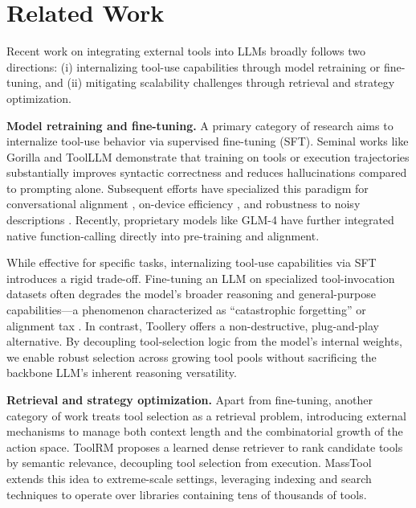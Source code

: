 \documentclass[11pt]{article}
\begin{document}
\section{Related Work}

Recent work on integrating external tools into LLMs broadly follows two directions: (i) internalizing tool-use capabilities through model retraining or fine-tuning, and (ii) mitigating scalability challenges through retrieval and strategy optimization.

\textbf{Model retraining and fine-tuning.}
A primary category of research aims to internalize tool-use behavior via supervised fine-tuning (SFT). Seminal works like Gorilla \cite{patil2024gorilla, touvron2023llama} and ToolLLM \cite{qin2023toolllm} demonstrate that training on tools or execution trajectories substantially improves syntactic correctness and reduces hallucinations compared to prompting alone. Subsequent efforts have specialized this paradigm for conversational alignment \cite{liu2024toolace, acikgoz2025can}, on-device efficiency \cite{erdogan2024tinyagent}, and robustness to noisy descriptions \cite{wang2025hammerbench}. Recently, proprietary models like GLM-4 \cite{zeng2025glm} have further integrated native function-calling directly into pre-training and alignment.

While effective for specific tasks, internalizing tool-use capabilities via SFT introduces a rigid trade-off. Fine-tuning an LLM on specialized tool-invocation datasets often degrades the model's broader reasoning and general-purpose capabilities---a phenomenon characterized as ``catastrophic forgetting'' or alignment tax \cite{kirkpatrick2017overcoming, luo2025empirical, fu-etal-2024-disperse}. In contrast, Toollery offers a non-destructive, plug-and-play alternative. By decoupling tool-selection logic from the model's internal weights, we enable robust selection across growing tool pools without sacrificing the backbone LLM's inherent reasoning versatility.


\textbf{Retrieval and strategy optimization.}
Apart from fine-tuning, another category of work treats tool selection as a retrieval problem, introducing external mechanisms to manage both context length and the combinatorial growth of the action space. ToolRM \cite{agarwal2025toolrm} proposes a learned dense retriever to rank candidate tools by semantic relevance, decoupling tool selection from execution. MassTool \cite{lin2025masstool} extends this idea to extreme-scale settings, leveraging indexing and search techniques to operate over libraries containing tens of thousands of tools.
\end{document}

